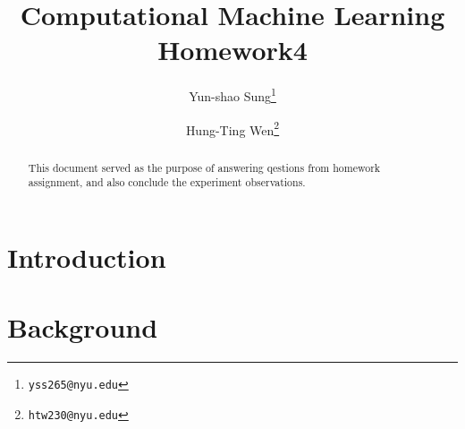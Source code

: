 \documentclass[final]{siamltexmm}
\title{Computational Machine Learning Homework4}
\author{Yun-shao Sung\thanks{\tt yss265@nyu.edu}
        \and Hung-Ting Wen\thanks{\tt htw230@nyu.edu}}
\begin{document}
\maketitle

\begin{abstract}
This document served as the purpose of answering qestions from homework assignment, and also conclude the experiment observations.
\end{abstract}

\pagestyle{myheadings}
\thispagestyle{plain}


\section{Introduction}


\section{Background}
\end{document}
